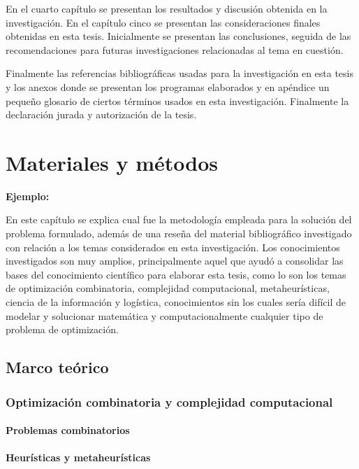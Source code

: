  En el cuarto capítulo se presentan los resultados y discusión obtenida en la investigación. En el capítulo cinco se presentan las consideraciones finales obtenidas en esta tesis. Inicialmente se presentan las conclusiones, seguida de las recomendaciones para futuras investigaciones relacionadas al tema en cuestión.

Finalmente las referencias bibliográficas usadas para la investigación en esta tesis y los anexos donde se presentan los programas elaborados y en apéndice un pequeño glosario de ciertos términos usados en esta investigación. Finalmente la declaración jurada y autorización de la tesis.




\chapter{Materiales y métodos}

{\bf Ejemplo:}\par

En este capítulo se explica cual fue la metodología empleada para la solución del problema formulado, además de una reseña del material bibliográfico investigado con relación a los temas considerados en esta investigación. Los conocimientos investigados son muy amplios, principalmente aquel que ayudó a consolidar las bases del conocimiento científico para elaborar esta tesis, como lo son los temas de optimización combinatoria, complejidad computacional, metaheurísticas, ciencia de la información y logística, conocimientos sin los cuales sería difícil de modelar y solucionar matemática y computacionalmente cualquier tipo de problema de optimización.


\section{Marco teórico}
\subsection{Optimización combinatoria y complejidad computacional}
\subsubsection{Problemas combinatorios}
\subsubsection{Heurísticas y metaheurísticas}

